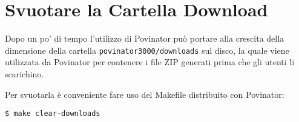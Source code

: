 \documentclass[12pt]{report}
\begin{document}
\section{Svuotare la Cartella Download}

Dopo un po' di tempo l'utilizzo di Povinator può portare alla crescita della dimensione della cartella \texttt{povinator3000/downloads} sul disco, la quale viene utilizzata da Povinator per contenere i file ZIP generati prima che gli utenti li scarichino.

Per svuotarla è conveniente fare uso del Makefile distribuito con Povinator:

\begin{verbatim}
$ make clear-downloads
\end{verbatim}
\end{document}

